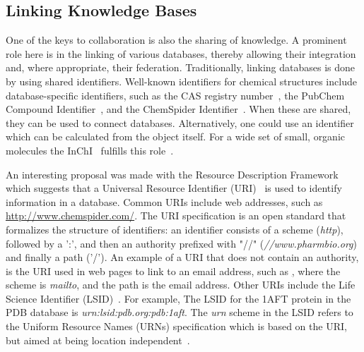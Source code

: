 \documentclass[11pt]{book}
\begin{document}
\subsection{Linking Knowledge Bases}

One of the keys to collaboration is also the sharing of knowledge.
A prominent role here is in the linking of various databases,
thereby allowing their integration and, where appropriate, their federation.
Traditionally, linking databases is done by using shared identifiers.
Well-known identifiers for chemical structures include
database-specific identifiers, such as the CAS registry number~\cite{url:casnumber},
the PubChem Compound Identifier~\cite{url:pubchemcid},
and the ChemSpider Identifier~\cite{url:chemspider}.
When these are shared, they can be used to connect databases.
Alternatively, one could use an identifier which can be calculated
from the object itself. For a wide set of small, organic molecules
the InChI~\cite{Stein2003} fulfills this role~\cite{Coles2005}.

An interesting proposal was made with the Resource Description
Framework~\cite{Carroll:04:RDF} which suggests that a Universal
Resource Identifier (URI)~\cite{rfc3986} is used to identify
information in a database. Common URIs include web addresses,
such as \url{http://www.chemspider.com/}.
The URI specification is an open
standard that formalizes the structure of identifiers:
an identifier consists of a scheme (\textit{http}),
followed by a ':', and then an authority prefixed with
"//" (\textit{//www.pharmbio.org}) and
finally a path ('/'). An example of a URI that does not contain an authority,
is the URI used in web pages to link to an email address, such as
\href{mailto:bioclipse-devel@lists.sourceforge.net}, where the
scheme is \textit{mailto}, and the path is the email address.
Other URIs include the Life Science Identifier (LSID)~\cite{Clark2004}.
For example, The LSID for the 1AFT protein in the
PDB database is \textit{urn:lsid:pdb.org:pdb:1aft}. The \textit{urn}
scheme in the LSID refers to the Uniform Resource Names (URNs)
specification which is based on the URI, but aimed at being
location independent~\cite{rfc2141}.
\end{document}
